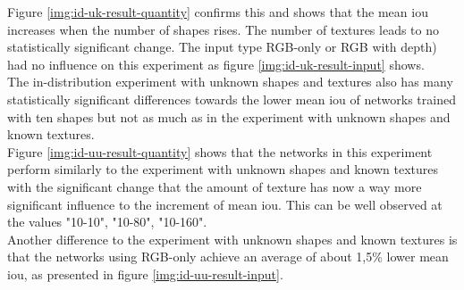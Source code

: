			Figure \ref{img:id-uk-result-quantity} confirms this and shows that the mean \ac{iou} increases when the number of shapes rises. The number of textures leads to no statistically significant change.
			The input type RGB-only or RGB with depth) had no influence on this experiment as figure \ref{img:id-uk-result-input} shows.\\
			The in-distribution experiment with unknown shapes and textures also has many statistically significant differences towards the lower mean \ac{iou} of networks trained with ten shapes but not as much as in the experiment with unknown shapes and known textures.\\ %
			Figure \ref{img:id-uu-result-quantity} shows that the networks in this experiment perform similarly to the experiment with unknown shapes and known textures with the significant change that the amount of texture has now a way more significant influence to the increment of mean \ac{iou}. This can be well observed at the values "10-10", "10-80", "10-160".\\
			Another difference to the experiment with unknown shapes and known textures is that the networks using RGB-only achieve an average of about 1,5\% lower mean \ac{iou}, as presented in figure \ref{img:id-uu-result-input}.
			
